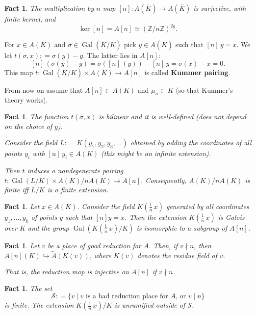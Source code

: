 \documentclass{article}
\newtheorem{fact}[proposition]{Fact}
\theoremstyle{definition}
\DeclareMathOperator{\Gal}{Gal}
\newcommand{\isom}{\simeq}
\newcommand{\term}{\textbf}
\newcommand{\dfn}{\mathrel{\mathop:}=}
\newcommand{\ZZ}{\mathbb{Z}}
\begin{document}
\begin{fact}
  The multiplication by $n$ map
  $[n]\colon A (\overline{K}) \to A (\overline{K})$ is surjective, with finite
  kernel, and
  $$\ker [n] = A [n] \isom (\ZZ/n\ZZ)^{2g}.$$
\end{fact}

For $x\in A (K)$ and $\sigma \in \Gal (\overline{K}/K)$ pick
$y\in A (\overline{K})$ such that $[n]\,y = x$. We let
$t (\sigma,x) \dfn \sigma (y) - y$. The latter lies in $A [n]$:
$$[n] \, (\sigma(y) - y) = \sigma ([n] \, (y)) - [n] \, y = \sigma (x) - x = 0.$$
This map $t\colon \Gal (\overline{K}/K) \times A (K) \to A [n]$ is called
\term{Kummer pairing}.

From now on assume that $A [n] \subset A (K)$ and $\mu_n \subset K$ (so that
Kummer's theory works).

\begin{fact}
  The function $t (\sigma,x)$ is bilinear and it is well-defined (does not
  depend on the choice of $y$).

  Consider the field $L \dfn K (y_1, y_2, y_3, \ldots)$ obtained by adding the
  coordinates of all points $y_i$ with $[n]\,y_i \in A (K)$ (this might be an
  infinite extension).

  Then $t$ induces a nondegenerate pairing
  $t\colon \Gal (L/K) \times A (K)/n A(K) \to A[n]$. Consequently,
  $A (K) / n A(K)$ is finite iff $L/K$ is a finite extension.
\end{fact}

\begin{fact}
  Let $x\in A(K)$. Consider the field $K (\frac{1}{n}\,x)$ generated by all
  coordinates $y_1, \ldots, y_k$ of points $y$ such that $[n] y = x$. Then the
  extension $K (\frac{1}{n}\,x)$ is Galois over $K$ and the group
  $\Gal (K (\frac{1}{n}\,x)/K)$ is isomorphic to a subgroup of $A [n]$.
\end{fact}

\begin{fact}
  Let $v$ be a place of good reduction for $A$. Then, if $v \nmid n$, then
  $A [n] (K) \hookrightarrow \widetilde{A} (K (v))$, where $K (v)$ denotes the
  residue field of $v$.

  That is, the reduction map is injective on $A [n]$ if $v \nmid n$.
\end{fact}

\begin{fact}
  The set
  $$\mathcal{S} \dfn \{ v \mid v\text{ is a bad reduction place for }A \text{, or } v\mid n \}$$
  is finite. The extension $K (\frac{1}{n}\,x)/K$ is unramified outside of
  $\mathcal{S}$.
\end{fact}
\end{document}
